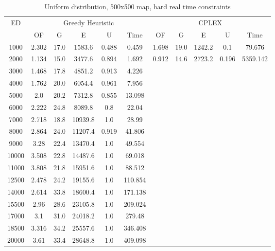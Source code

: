 \begin{table}[htb]
	\centering
	\begin{tabular}{|c|c|c|c|c|c|c|c|c|c|c|}
		\hline
		\multirow{2}{*}{ED} & \multicolumn{5}{c|}{Greedy Heuristic} & \multicolumn{5}{c|}{CPLEX}\\ 
		\cline{2-11}
& OF & G & E & U & Time & OF & G & E & U & Time\\ 
		\hline
		1000 & 2.302 & 17.0 & 1583.6 & 0.488 & 0.459 & 1.698 & 19.0 & 1242.2 & 0.1 & 79.676 \\ 
		2000 & 1.134 & 15.0 & 3477.6 & 0.894 & 1.692 & 0.912 & 14.6 & 2723.2 & 0.196 & 5359.142 \\ 
		3000 & 1.468 & 17.8 & 4851.2 & 0.913 & 4.226 & & & & &  \\ 
		4000 & 1.762 & 20.0 & 6054.4 & 0.961 & 7.956 & & & & &  \\ 
		5000 & 2.0 & 20.2 & 7312.8 & 0.855 & 13.098 & & & & &  \\ 
		6000 & 2.222 & 24.8 & 8089.8 & 0.8 & 22.04 & & & & &  \\ 
		7000 & 2.718 & 18.8 & 10939.8 & 1.0 & 28.99 & & & & &  \\ 
		8000 & 2.864 & 24.0 & 11207.4 & 0.919 & 41.806 & & & & &  \\ 
		9000 & 3.28 & 22.4 & 13470.4 & 1.0 & 49.554 & & & & &  \\ 
		10000 & 3.508 & 22.8 & 14487.6 & 1.0 & 69.018 & & & & &  \\ 
		11000 & 3.808 & 21.8 & 15951.6 & 1.0 & 88.512 & & & & &  \\ 
		12500 & 2.478 & 24.2 & 19155.6 & 1.0 & 110.854 & & & & &  \\ 
		14000 & 2.614 & 33.8 & 18600.4 & 1.0 & 171.138 & & & & &  \\ 
		15500 & 2.96 & 28.6 & 23105.8 & 1.0 & 209.024 & & & & &  \\ 
		17000 & 3.1 & 31.0 & 24018.2 & 1.0 & 279.48 & & & & &  \\ 
		18500 & 3.316 & 34.2 & 25557.6 & 1.0 & 346.408 & & & & &  \\ 
		20000 & 3.61 & 33.4 & 28648.8 & 1.0 & 409.098 & & & & &  \\ 
		\hline 
	\end{tabular} 
	\caption{Uniform distribution, 500x500 map, hard real time constraints} 
	\label{tab:unif_hard_n_esc_500} 
\end{table} 


